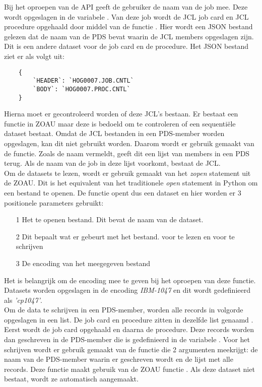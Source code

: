 \vspace{5 mm}
Bij het oproepen van de API geeft de gebruiker de naam van de job mee. Deze wordt opgeslagen in de variabele . Van deze job wordt de JCL job card en JCL procedure opgehaald door middel van de functie . Hier wordt een JSON bestand gelezen dat de naam van de PDS bevat waarin de JCL members opgeslagen zijn. Dit is een andere dataset voor de job card en de procedure. Het JSON bestand ziet er als volgt uit: \\

\begin{lstlisting}
    {
        `HEADER`: `HOG0007.JOB.CNTL`
        `BODY`: `HOG0007.PROC.CNTL`
    }
\end{lstlisting}

Hierna moet er gecontroleerd worden of deze JCL's bestaan. Er bestaat een  functie in ZOAU maar deze is bedoeld om te controleren of een sequentiële dataset bestaat. Omdat de JCL bestanden in een PDS-member worden opgeslagen, kan dit niet gebruikt worden. Daarom wordt er gebruik gemaakt van de  functie. Zoals de naam vermeldt, geeft dit een lijst van members in een PDS terug. Als de naam van de job in deze lijst voorkomt, bestaat de JCL. \\
 
Om de datasets te lezen, wordt er gebruik gemaakt van het \textit{zopen} statement uit de ZOAU. Dit is het equivalent van het traditionele \textit{open} statement in Python om een bestand te openen. De  functie opent dus een dataset en hier worden er 3 positionele parameters gebruikt: 
\begin{itemize}
    \item[1] Het te openen bestand. Dit bevat de naam van de dataset.
    \item[2] Dit bepaalt wat er gebeurt met het bestand. \textit{} voor te lezen en \textit{} voor te schrijven
    \item[3] De encoding van het meegegeven bestand
\end{itemize} 
Het is belangrijk om de encoding mee te geven bij het oproepen van deze functie. Datasets worden opgeslagen in de encoding \textit{IBM-1047} en dit wordt gedefinieerd als \textit{'cp1047'}. \\

Om de data te schrijven in een PDS-member, worden alle records in volgorde opgeslagen in een list. De job card en procedure zitten in dezelfde list genaamd . Eerst wordt de job card opgehaald en daarna de procedure. Deze records worden dan geschreven in de PDS-member die is gedefinieerd in de variabele . Voor het schrijven wordt er gebruik gemaakt van de functie  die 2 argumenten meekrijgt: de naam van de PDS-member waarin er geschreven wordt en de lijst met alle records. Deze functie maakt gebruik van de ZOAU functie . Als deze dataset niet bestaat, wordt ze automatisch aangemaakt.


